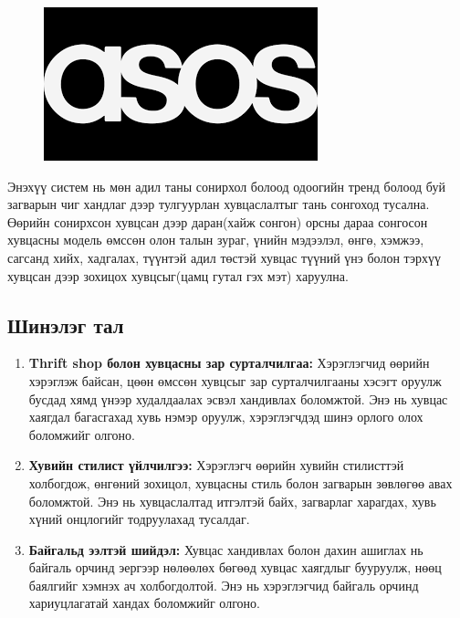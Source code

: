 \begin{figure}[!http]
	\includegraphics[scale=0.8]{figures/images.png}
\end{figure}
\par Энэхүү систем нь мөн адил таны сонирхол болоод одоогийн тренд болоод буй загварын чиг хандлаг дээр тулгуурлан хувцаслалтыг тань сонгоход тусална.
Өөрийн сонирхсон хувцсан дээр даран(хайж сонгон) орсны дараа сонгосон хувцасны модель өмссөн олон талын зураг, үнийн мэдээлэл, өнгө, хэмжээ, сагсанд хийх, хадгалах, түүнтэй адил төстэй хувцас түүний үнэ болон тэрхүү хувцсан дээр зохицох хувцсыг(цамц гутал гэх мэт) харуулна.
\subsection*{Шинэлэг тал}
\begin{enumerate}
   \item \textbf{Thrift shop болон хувцасны зар сурталчилгаа:} Хэрэглэгчид өөрийн хэрэглэж байсан, цөөн өмссөн хувцсыг зар сурталчилгааны хэсэгт оруулж бусдад хямд үнээр худалдаалах эсвэл хандивлах боломжтой. Энэ нь хувцас хаягдал багасгахад хувь нэмэр оруулж, хэрэглэгчдэд шинэ орлого олох боломжийг олгоно.
   \item \textbf{Хувийн стилист үйлчилгээ:} Хэрэглэгч өөрийн хувийн стилисттэй холбогдож, өнгөний зохицол, хувцасны стиль болон загварын зөвлөгөө авах боломжтой. Энэ нь хувцаслалтад итгэлтэй байх, загварлаг харагдах, хувь хүний онцлогийг тодруулахад тусалдаг.
   \item \textbf{Байгальд ээлтэй шийдэл:} Хувцас хандивлах болон дахин ашиглах нь байгаль орчинд эергээр нөлөөлөх бөгөөд хувцас хаягдлыг бууруулж, нөөц баялгийг хэмнэх ач холбогдолтой. Энэ нь хэрэглэгчид байгаль орчинд хариуцлагатай хандах боломжийг олгоно.
\end{enumerate}
